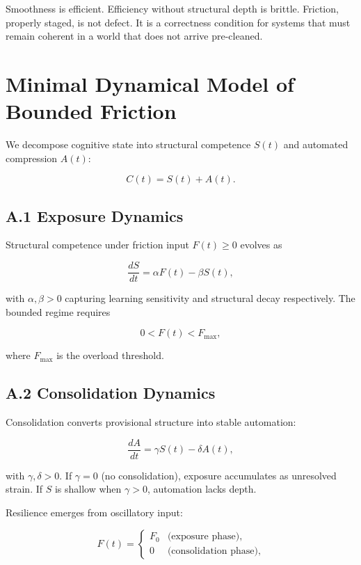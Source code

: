 \documentclass[11pt]{article}
\theoremstyle{remark}
\begin{document}
Smoothness is efficient. Efficiency without structural depth is brittle. Friction, properly staged, is not defect. It is a correctness condition for systems that must remain coherent in a world that does not arrive pre-cleaned.


\appendix

\section{Minimal Dynamical Model of Bounded Friction}
\label{app:dynamics}

We decompose cognitive state into structural competence $S(t)$ and automated compression $A(t)$:

\[
C(t) = S(t) + A(t).
\]

\subsection*{A.1 Exposure Dynamics}

Structural competence under friction input $F(t) \geq 0$ evolves as

\[
\frac{dS}{dt} = \alpha F(t) - \beta S(t),
\]

with $\alpha, \beta > 0$ capturing learning sensitivity and structural decay respectively. The bounded regime requires

\[
0 < F(t) < F_{\max},
\]

where $F_{\max}$ is the overload threshold.

\subsection*{A.2 Consolidation Dynamics}

Consolidation converts provisional structure into stable automation:

\[
\frac{dA}{dt} = \gamma S(t) - \delta A(t),
\]

with $\gamma, \delta > 0$. If $\gamma = 0$ (no consolidation), exposure accumulates as unresolved strain. If $S$ is shallow when $\gamma > 0$, automation lacks depth.

Resilience emerges from oscillatory input:

\[
F(t) = \begin{cases} F_0 & \text{(exposure phase),} \\ 0 & \text{(consolidation phase),} \end{cases}
\]
\end{document}
